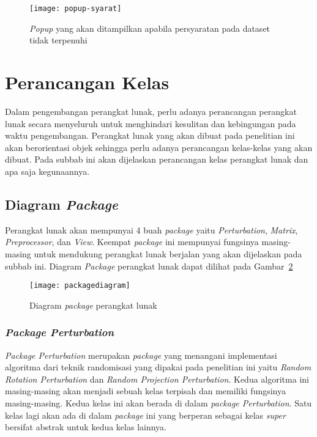 \begin{figure}
	\centering
	\texttt{[image: popup-syarat]}
	\caption{\textit{Popup} yang akan ditampilkan apabila persyaratan pada dataset tidak terpenuhi}
	\label{fig:popup-syarat}
\end{figure}

\section{Perancangan Kelas}
\label{sec:kelas}

Dalam pengembangan perangkat lunak, perlu adanya perancangan perangkat lunak secara menyeluruh untuk menghindari kesulitan dan kebingungan pada waktu pengembangan. Perangkat lunak yang akan dibuat pada penelitian ini akan berorientasi objek sehingga perlu adanya perancangan kelas-kelas yang akan dibuat. Pada subbab ini akan dijelaskan perancangan kelas perangkat lunak dan apa saja kegunaannya.

\subsection{Diagram \textit{Package}}
\label{subsec:diagram-package}

Perangkat lunak akan mempunyai 4 buah \textit{package} yaitu \textit{Perturbation}, \textit{Matrix}, \textit{Preprocessor}, dan \textit{View}. Keempat \textit{package} ini mempunyai fungsinya masing-masing untuk mendukung perangkat lunak berjalan yang akan dijelaskan pada subbab ini. Diagram \textit{Package} perangkat lunak dapat dilihat pada Gambar~\ref{fig:packagediagram}

\begin{figure}
	\centering
	\texttt{[image: packagediagram]}
	\caption{Diagram \textit{package} perangkat lunak}
	\label{fig:packagediagram}
\end{figure}

\subsubsection{\textit{Package Perturbation}}
\label{subsubsec:package-perturbation}

\textit{Package Perturbation} merupakan \textit{package} yang menangani implementasi algoritma dari teknik randomisasi yang dipakai pada penelitian ini yaitu \textit{Random Rotation Perturbation} dan \textit{Random Projection Perturbation}. Kedua algoritma ini masing-masing akan menjadi sebuah kelas terpisah dan memiliki fungsinya masing-masing. Kedua kelas ini akan berada di dalam \textit{package Perturbation}. Satu kelas lagi akan ada di dalam \textit{package} ini yang berperan sebagai kelas \textit{super} bersifat abstrak untuk kedua kelas lainnya.

